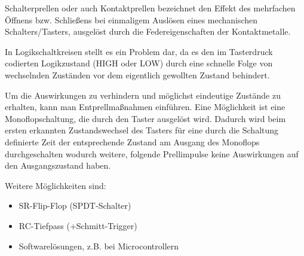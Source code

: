 Schalterprellen oder auch Kontaktprellen bezeichnet den Effekt des mehrfachen
Öffnens bzw. Schließens bei einmaligem Auslösen eines mechanischen
Schalters/Tasters, ausgelöst durch die Federeigenschaften der Kontaktmetalle.

In Logikschaltkreisen stellt es ein Problem dar, da es den im Tasterdruck codierten
Logikzustand (HIGH oder LOW) durch eine schnelle Folge von wechselnden Zuständen
vor dem eigentlich gewollten Zustand behindert.

Um die Auswirkungen zu verhindern und möglichst eindeutige Zustände zu erhalten,
kann man Entprellmaßnahmen einführen. Eine Möglichkeit ist eine
Monoflopschaltung, die durch den Taster ausgelöst wird. Dadurch wird beim ersten
erkannten Zustandswechsel des Tasters für eine durch die Schaltung definierte
Zeit der entsprechende Zustand am Ausgang des Monoflops durchgeschalten wodurch
weitere, folgende Prellimpulse keine Auswirkungen auf den Ausgangszustand haben.

Weitere Möglichkeiten sind:
\begin{itemize}
\item SR-Flip-Flop (SPDT-Schalter)
\item RC-Tiefpass (+Schmitt-Trigger)
\item Softwarelösungen, z.B. bei Microcontrollern
\end{itemize}

